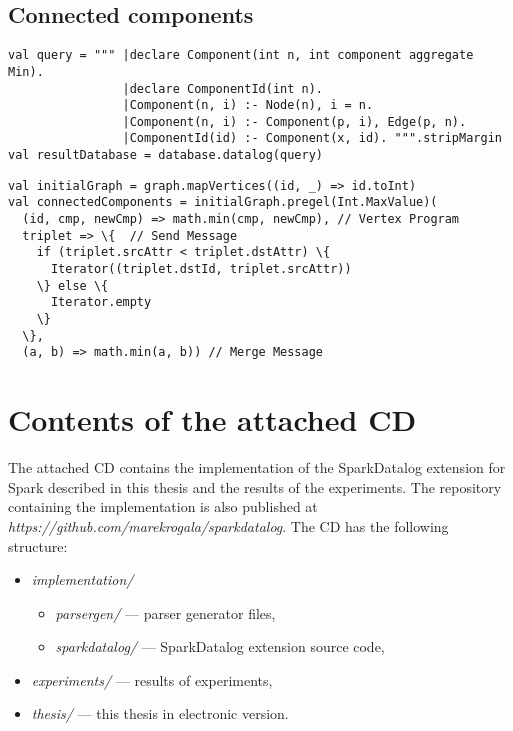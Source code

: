 \section{Connected components}
\begin{Verbatim}[label=Connected components - SparkDatalog]
val query = """ |declare Component(int n, int component aggregate Min).
                |declare ComponentId(int n).
                |Component(n, i) :- Node(n), i = n.
                |Component(n, i) :- Component(p, i), Edge(p, n).
                |ComponentId(id) :- Component(x, id). """.stripMargin
val resultDatabase = database.datalog(query)
\end{Verbatim}

\vspace{0.4cm}

\begin{Verbatim}[label=Connected components - Spark]
val initialGraph = graph.mapVertices((id, _) => id.toInt)
val connectedComponents = initialGraph.pregel(Int.MaxValue)(
  (id, cmp, newCmp) => math.min(cmp, newCmp), // Vertex Program
  triplet => \{  // Send Message
    if (triplet.srcAttr < triplet.dstAttr) \{
      Iterator((triplet.dstId, triplet.srcAttr))
    \} else \{
      Iterator.empty
    \}
  \},
  (a, b) => math.min(a, b)) // Merge Message
\end{Verbatim}

\chapter{Contents of the attached CD}\label{appendixb}

The attached CD contains the implementation of the SparkDatalog extension for Spark described in this thesis and the results of the experiments. The repository containing the implementation is also published at \emph{https://github.com/marekrogala/sparkdatalog}. The CD has the following structure:
\begin{itemize}
\item \emph{implementation/}
	\begin{itemize}
	\item \emph{parsergen/} --- parser generator files,
	\item \emph{sparkdatalog/} --- SparkDatalog extension source code,
	\end{itemize}
\item \emph{experiments/} --- results of experiments,
\item \emph{thesis/} --- this thesis in electronic version.
\end{itemize}
